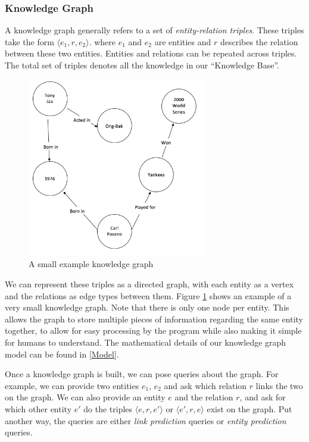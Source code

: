 \documentclass[pageno]{jpaper}
\begin{document}
\subsubsection{Knowledge Graph}
\label{Knowledge Graph}

A knowledge graph generally refers to a set of \textit{entity-relation triples}.
These triples take the form $\langle e_1, r, e_2 \rangle$. where $e_1$ and $e_2$
are entities and $r$ describes the relation between these two entities. Entities
and relations can be repeated across triples. The total set of triples denotes
all the knowledge in our ``Knowledge Base''.

\begin{figure}
    \centering
    \includegraphics[width=0.7\textwidth,keepaspectratio]{figures/Example_KG.png}
    \caption{A small example knowledge graph}
    \label{Figure: KG}
\end{figure}

We can represent these triples as a directed graph, with each entity as a vertex
and the relations as edge types between them. Figure \ref{Figure: KG} shows an
example of a very small knowledge graph. Note that there is only one node per
entity. This allows the graph to store multiple pieces of information regarding
the same entity together, to allow for easy processing by the program while also
making it simple for humans to understand. The mathematical details of our
knowledge graph model can be found in \ref{Model}.

Once a knowledge graph is built, we can pose queries about the graph. For
example, we can provide two entities $e_1$, $e_2$ and ask which relation $r$
links the two on the graph. We can also provide an entity $e$ and the relation
$r$, and ask for which other entity $e'$ do the triples $\langle e,r,e' \rangle$
or $\langle e',r,e \rangle$ exist on the graph. Put another way, the queries are
either \textit{link prediction} queries or \textit{entity prediction} queries.
\end{document}
